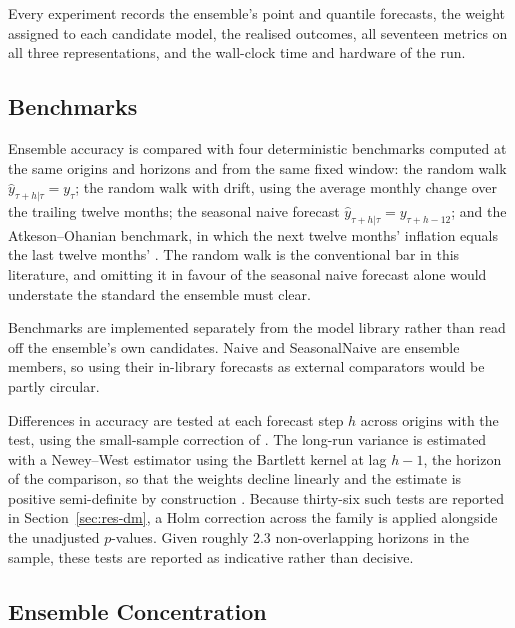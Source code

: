 \documentclass[12pt]{article}
\begin{document}
Every experiment records the ensemble's point and quantile forecasts, the
weight assigned to each candidate model, the realised outcomes, all seventeen
metrics on all three representations, and the wall-clock time and hardware of
the run.

\subsection{Benchmarks}
\label{sec:method-benchmarks}

Ensemble accuracy is compared with four deterministic benchmarks computed at
the same origins and horizons and from the same fixed window: the random walk
$\hat{y}_{\tau+h|\tau} = y_\tau$; the random walk with drift, using the average
monthly change over the trailing twelve months; the seasonal naive forecast
$\hat{y}_{\tau+h|\tau} = y_{\tau+h-12}$; and the Atkeson--Ohanian benchmark, in
which the next twelve months' inflation equals the last twelve months'
\citep{atkeson2001}. The random walk is the conventional bar in this
literature, and omitting it in favour of the seasonal naive forecast alone
would understate the standard the ensemble must clear.

Benchmarks are implemented separately from the model library rather than read
off the ensemble's own candidates. Naive and SeasonalNaive are ensemble
members, so using their in-library forecasts as external comparators would be
partly circular.

Differences in accuracy are tested at each forecast step $h$ across origins
with the \citet{diebold1995} test, using the small-sample correction of
\citet{harvey1997}. The long-run variance is estimated with a Newey--West
estimator using the Bartlett kernel at lag $h - 1$, the horizon of the
comparison, so that the weights decline linearly and the estimate is positive
semi-definite by construction \citep{neweywest1987}. Because thirty-six such
tests are reported in Section~\ref{sec:res-dm}, a Holm correction across the
family is applied alongside the unadjusted $p$-values. Given roughly 2.3
non-overlapping horizons in the sample, these tests are reported as indicative
rather than decisive.

\subsection{Ensemble Concentration}
\label{sec:method-weights}
\end{document}
